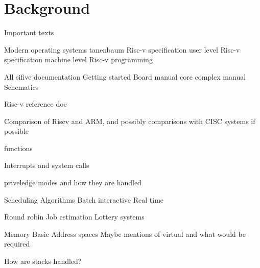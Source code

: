 \chapter[Background]{Background}
\label{cha:backgr}
Important texts

Modern operating systems tanenbaum
Risc-v specification user level
Risc-v specification machine level
Risc-v programming

All sifive documentation
    Getting started
    Board manual
    core complex manual
    Schematics

Risc-v reference doc

Comparison of Riscv and ARM, and possibly comparisons with CISC systems if possible

functions

Interrupts and system calls

priveledge modes and how they are handled


Scheduling Algorithms
    Batch
    interactive
    Real time

    Round robin
    Job estimation
    Lottery systems

Memory
    Basic
    Address spaces
    Maybe mentions of virtual and what would be required

    How are stacks handled?
